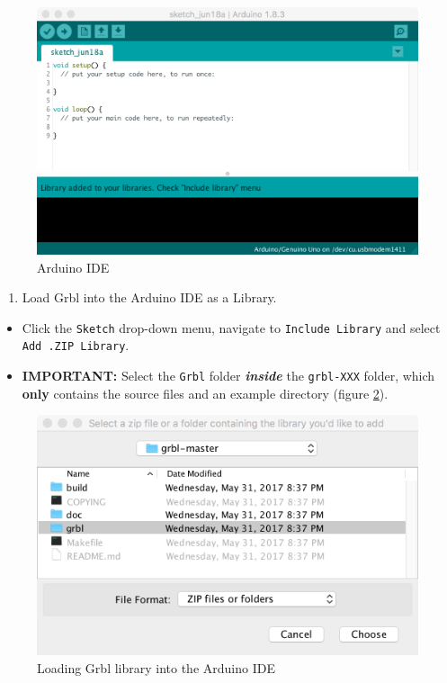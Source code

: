 \documentclass[]{book}
\providecommand{\tightlist}{%
  \setlength{\itemsep}{0pt}\setlength{\parskip}{0pt}}
\theoremstyle{definition}
\theoremstyle{definition}
\theoremstyle{definition}
\theoremstyle{remark}
\begin{document}
\begin{figure}

{\centering \includegraphics[width=0.75\linewidth]{images/arduino_IDE} 

}

\caption{Arduino IDE}\label{fig:arduinoIDE}
\end{figure}

\begin{enumerate}
\def\labelenumi{\arabic{enumi}.}
\setcounter{enumi}{2}
\tightlist
\item
  Load Grbl into the Arduino IDE as a Library.
\end{enumerate}

\begin{itemize}
\tightlist
\item
  Click the \texttt{Sketch} drop-down menu, navigate to
  \texttt{Include\ Library} and select \texttt{Add\ .ZIP\ Library}.
\item
  \textbf{IMPORTANT:} Select the \texttt{Grbl} folder
  \textbf{\emph{inside}} the \texttt{grbl-XXX} folder, which
  \textbf{only} contains the source files and an example directory
  (figure \ref{fig:addGrblLib}).
\end{itemize}

\begin{figure}

{\centering \includegraphics[width=0.75\linewidth]{images/add_grbl_lib} 

}

\caption{Loading Grbl library into the Arduino IDE}\label{fig:addGrblLib}
\end{figure}
\end{document}
